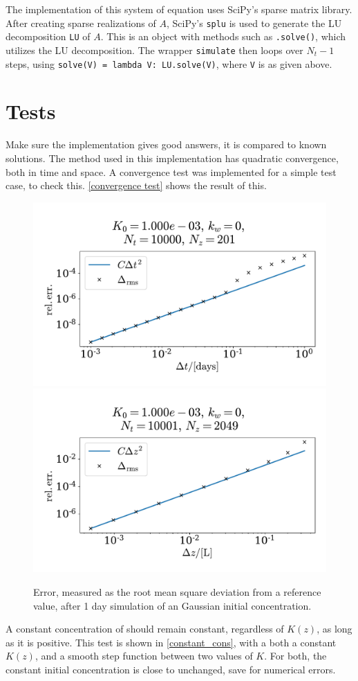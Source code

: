 \documentclass{article}
\begin{document}
    The implementation of this system of equation uses SciPy's sparse matrix library. After creating sparse realizations of $A$, SciPy's \verb|splu| is used to generate the LU decomposition \verb|LU| of $A$. This is an object with methods such as \verb|.solve()|, which utilizes the LU decomposition. The wrapper \verb|simulate| then loops over $N_t-1$ steps, using \verb|solve(V) = lambda V: LU.solve(V)|, where \verb|V| is as given above. 

    \section*{Tests}
    Make sure the implementation gives good answers, it is compared to known solutions. The method used in this implementation has quadratic convergence, both in time and space. A convergence test was implemented for a simple test case, to check this. \autoref{convergence test} shows the result of this. 

    \begin{figure}
        \centering
        \includegraphics[width=.49\textwidth]{../plots/conv_test_t}
        \includegraphics[width=.49\textwidth]{../plots/conv_test_z}
        \caption{Error, measured as the root mean square deviation from a reference value, after 1 day simulation of an Gaussian initial concentration.}
        \label{convergence test}
    \end{figure}

    A constant concentration of  should remain constant, regardless of $K(z)$, as long as it is positive. This test is shown in \autoref{constant_cons}, with a both a constant $K(z)$, and a smooth step function between two values of $K$. For both, the constant initial concentration is close to unchanged, save for numerical errors.
\end{document}

